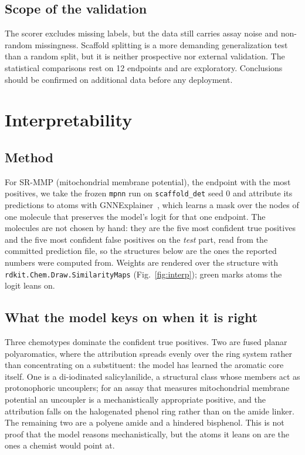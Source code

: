 \documentclass[conference]{IEEEtran}
\newcommand{\code}[1]{\texttt{\small #1}}
\begin{document}
\subsection{Scope of the validation}
The scorer excludes missing labels, but the data still carries assay noise and non-random
missingness. Scaffold splitting is a more demanding generalization test than a random split, but
it is neither prospective nor external validation. The statistical comparisons rest on 12
endpoints and are exploratory. Conclusions should be confirmed on additional data before any
deployment.

\section{Interpretability}
\label{sec:interpretability}
\subsection{Method}
For SR-MMP (mitochondrial membrane potential), the endpoint with the most positives, we take the
frozen \code{mpnn} run on \code{scaffold\_det} seed 0 and attribute its predictions to atoms with
GNNExplainer~\citep{ying2019gnnexplainer}, which learns a mask over the nodes of one molecule that
preserves the model's logit for that one endpoint. The molecules are not chosen by hand: they are
the five most confident true positives and the five most confident false positives on the
\emph{test} part, read from the committed prediction file, so the structures below are the ones
the reported numbers were computed from. Weights are rendered over the structure with
\code{rdkit.Chem.Draw.SimilarityMaps} (Fig.~\ref{fig:interp}); green marks atoms the logit leans
on.

\subsection{What the model keys on when it is right}
Three chemotypes dominate the confident true positives. Two are fused planar polyaromatics, where
the attribution spreads evenly over the ring system rather than concentrating on a substituent:
the model has learned the aromatic core itself. One is a di-iodinated salicylanilide, a structural
class whose members act as protonophoric uncouplers; for an assay that measures mitochondrial
membrane potential an uncoupler is a mechanistically appropriate positive, and the attribution
falls on the halogenated phenol ring rather than on the amide linker. The remaining two are a
polyene amide and a hindered bisphenol. This is not proof that the model reasons mechanistically,
but the atoms it leans on are the ones a chemist would point at.
\end{document}
